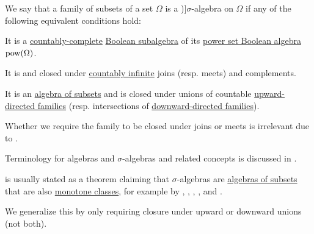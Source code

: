 \begin{definition}\label{def:sigma_algebra}
  We say that a family of subsets of a set \( \Omega \) is a \term[ru=\( \sigma \)-алгебра (\cite[def. II.1.4]{Ширяев2007ВероятностиТом1})]{\( \sigma \)-algebra} on \( \Omega \) if any of the following equivalent conditions hold:
  \begin{thmenum}
    \mimprovised It is a \hyperref[def:countably_complete_lattice]{countably-complete} \hyperref[def:boolean_algebra/submodel]{Boolean subalgebra} of its \hyperref[thm:boolean_algebra_of_subsets]{power set Boolean algebra} \( \operatorname{pow}(\Omega) \).

     It is  and closed under \hyperref[def:set_countability/countably_infinite]{countably infinite} joins (resp. meets) and complements.

     It is an \hyperref[def:algebra_of_subsets]{algebra of subsets} and is closed under unions of countable \hyperref[def:directed_set]{upward-directed families} (resp. intersections of \hyperref[def:directed_set]{downward-directed families}).
  \end{thmenum}
\end{definition}
\begin{comments}
  \item Whether we require the family to be closed under joins or meets is irrelevant due to .

  \item Terminology for algebras and \( \sigma \)-algebras and related concepts is discussed in .
  \item {} is usually stated as a theorem claiming that \( \sigma \)-algebras are \hyperref[def:algebra_of_subsets]{algebras of subsets} that are also \hyperref[def:monotone_class]{monotone classes}, for example by
  ,
  ,
  ,
  ,
   and
  .

  We generalize this by only requiring closure under upward or downward unions (not both).
\end{comments}
